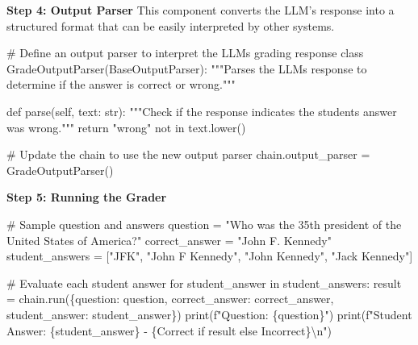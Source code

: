 \documentclass[
]{agujournal2019}
\newenvironment{Shaded}{\begin{snugshade}}{\end{snugshade}}
\newcommand{\BuiltInTok}[1]{\textcolor[rgb]{0.00,0.23,0.31}{#1}}
\newcommand{\CharTok}[1]{\textcolor[rgb]{0.13,0.47,0.30}{#1}}
\newcommand{\CommentTok}[1]{\textcolor[rgb]{0.37,0.37,0.37}{#1}}
\newcommand{\ControlFlowTok}[1]{\textcolor[rgb]{0.00,0.23,0.31}{#1}}
\newcommand{\KeywordTok}[1]{\textcolor[rgb]{0.00,0.23,0.31}{#1}}
\newcommand{\NormalTok}[1]{\textcolor[rgb]{0.00,0.23,0.31}{#1}}
\newcommand{\OperatorTok}[1]{\textcolor[rgb]{0.37,0.37,0.37}{#1}}
\newcommand{\SpecialCharTok}[1]{\textcolor[rgb]{0.37,0.37,0.37}{#1}}
\newcommand{\SpecialStringTok}[1]{\textcolor[rgb]{0.13,0.47,0.30}{#1}}
\newcommand{\StringTok}[1]{\textcolor[rgb]{0.13,0.47,0.30}{#1}}
\newcommand{\VariableTok}[1]{\textcolor[rgb]{0.07,0.07,0.07}{#1}}
\begin{document}
\textbf{Step 4: Output Parser} This component converts the LLM's
response into a structured format that can be easily interpreted by
other systems.

\begin{Shaded}
\begin{Highlighting}[]
\CommentTok{\# Define an output parser to interpret the LLM\textquotesingle{}s grading response}
\KeywordTok{class}\NormalTok{ GradeOutputParser(BaseOutputParser):}
    \CommentTok{"""Parses the LLM\textquotesingle{}s response to determine if the answer is correct or wrong."""}
    
    \KeywordTok{def}\NormalTok{ parse(}\VariableTok{self}\NormalTok{, text: }\BuiltInTok{str}\NormalTok{):}
        \CommentTok{"""Check if the response indicates the student\textquotesingle{}s answer was wrong."""}
        \ControlFlowTok{return} \StringTok{"wrong"} \KeywordTok{not} \KeywordTok{in}\NormalTok{ text.lower()}

\CommentTok{\# Update the chain to use the new output parser}
\NormalTok{chain.output\_parser }\OperatorTok{=}\NormalTok{ GradeOutputParser()}
\end{Highlighting}
\end{Shaded}

\textbf{Step 5: Running the Grader}

\begin{Shaded}
\begin{Highlighting}[]
\CommentTok{\# Sample question and answers}
\NormalTok{question }\OperatorTok{=} \StringTok{"Who was the 35th president of the United States of America?"}
\NormalTok{correct\_answer }\OperatorTok{=} \StringTok{"John F. Kennedy"}
\NormalTok{student\_answers }\OperatorTok{=}\NormalTok{ [}\StringTok{"JFK"}\NormalTok{, }\StringTok{"John F Kennedy"}\NormalTok{, }\StringTok{"John Kennedy"}\NormalTok{, }\StringTok{"Jack Kennedy"}\NormalTok{]}

\CommentTok{\# Evaluate each student answer}
\ControlFlowTok{for}\NormalTok{ student\_answer }\KeywordTok{in}\NormalTok{ student\_answers:}
\NormalTok{    result }\OperatorTok{=}\NormalTok{ chain.run(\{}\StringTok{\textquotesingle{}question\textquotesingle{}}\NormalTok{: question, }\StringTok{\textquotesingle{}correct\_answer\textquotesingle{}}\NormalTok{: correct\_answer, }\StringTok{\textquotesingle{}student\_answer\textquotesingle{}}\NormalTok{: student\_answer\})}
    \BuiltInTok{print}\NormalTok{(}\SpecialStringTok{f"Question: }\SpecialCharTok{\{}\NormalTok{question}\SpecialCharTok{\}}\SpecialStringTok{"}\NormalTok{)}
    \BuiltInTok{print}\NormalTok{(}\SpecialStringTok{f"Student Answer: }\SpecialCharTok{\{}\NormalTok{student\_answer}\SpecialCharTok{\}}\SpecialStringTok{ {-} }\SpecialCharTok{\{}\StringTok{\textquotesingle{}Correct\textquotesingle{}} \ControlFlowTok{if}\NormalTok{ result }\ControlFlowTok{else} \StringTok{\textquotesingle{}Incorrect\textquotesingle{}}\SpecialCharTok{\}}\CharTok{\textbackslash{}n}\SpecialStringTok{"}\NormalTok{)}
\end{Highlighting}
\end{Shaded}
\end{document}
